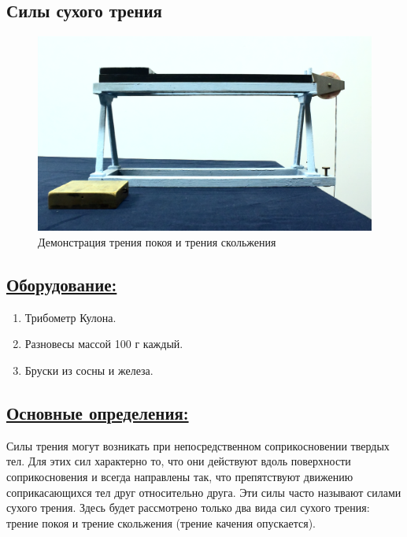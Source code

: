 \documentclass[14pt,a4paper,oneside]{extarticle}	%
\begin{document}

	
	\begin{center}
		\subsection*{Силы сухого трения}
	\end{center}
	
	\begin{figure}[H]
		\centering 	
		\includegraphics[width=0.9\linewidth]{friction-4.png}
		\caption{Демонстрация трения покоя и трения скольжения}
		\label{friction-4}
	\end{figure}
	
	\subsection*{\underline{Оборудование:}}
	
	\begin{enumerate} 
		\item Трибометр Кулона.
		\item Разновесы массой 100 г каждый.
		\item Бруски из сосны и железа.
		
	\end{enumerate}

	\subsection*{\underline{Основные определения:}}
	
Силы трения могут возникать при непосредственном соприкосновении твердых тел.
Для этих сил характерно то, что они действуют вдоль поверхности соприкосновения и всегда направлены 
	так, что препятствуют движению соприкасающихся тел друг относительно друга.
	Эти силы часто называют силами сухого трения. 
	Здесь будет рассмотрено только два вида сил сухого трения: трение покоя 
	и трение скольжения (трение качения опускается).
	
\end{document}
